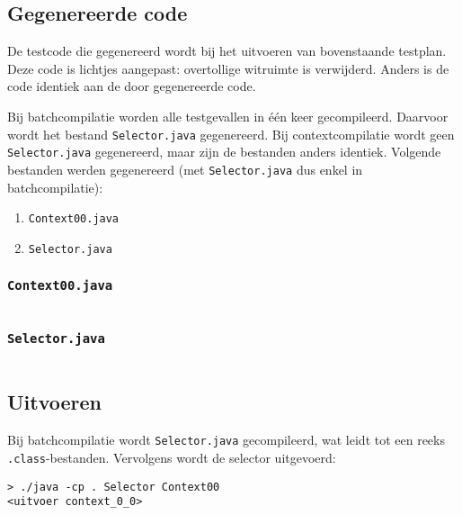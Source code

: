 \inputminted{java}{sources/echo-function/correct.java}

\subsection{Gegenereerde code}\label{subsec:echo-function-java-gegenereerde-code}

De testcode die gegenereerd wordt bij het uitvoeren van bovenstaande testplan.
Deze code is lichtjes aangepast: overtollige witruimte is verwijderd.
Anders is de code identiek aan de door \tested{} gegenereerde code.

Bij batchcompilatie worden alle testgevallen in één keer gecompileerd.
Daarvoor wordt het bestand \texttt{Selector.java} gegenereerd.
Bij contextcompilatie wordt geen \texttt{Selector.java} gegenereerd, maar zijn de bestanden anders identiek.
Volgende bestanden werden gegenereerd (met \texttt{Selector.java} dus enkel in batchcompilatie):

\begin{enumerate}
    \item \texttt{Context00.java}
    \item \texttt{Selector.java}
\end{enumerate}

\subsubsection{\texttt{Context00.java}}

\inputminted{java}{sources/echo-function/Context00.java}

\subsubsection{\texttt{Selector.java}}

\inputminted{java}{sources/echo-function/Selector.java}

\subsection{Uitvoeren}\label{subsec:echo-function-java-uitvoeren}

Bij batchcompilatie wordt \texttt{Selector.java} gecompileerd, wat leidt tot een reeks \texttt{.class}-bestanden.
Vervolgens wordt de selector uitgevoerd:

\begin{verbatim}
> ./java -cp . Selector Context00
<uitvoer context_0_0>
\end{verbatim}

